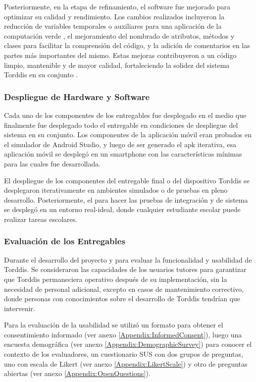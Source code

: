 				Posteriormente, en la etapa de refinamiento, el software fue mejorado para optimizar su calidad y rendimiento. Los cambios realizados incluyeron la reducción de variables temporales o auxiliares para una aplicación de la computación verde \citep{Firmansyah2024Integrating}, el mejoramiento del nombrado de atributos, métodos y clases para facilitar la comprensión del código, y la adición de comentarios en las partes más importantes del mismo. Estas mejoras contribuyeron a un código limpio, mantenible y de mayor calidad, fortaleciendo la solidez del sistema Torddis en su conjunto \citep{Marabesi2024Exploring}.
			
			\subsubsection{Despliegue de Hardware y Software}
				Cada uno de los componentes de los entregables fue desplegado en el medio que finalmente fue desplegado todo el entregable en condiciones de despliegue del sistema en su conjunto. Los componentes de la aplicación móvil eran probados en el simulador de Android Studio, y luego de ser generado el apk iterativa, esa aplicación móvil se desplegó en un smartphone con las características mínimas para las cuales fue desarrollada.
			
				El despliegue de los componentes del entregable final o del dispositivo Torddis se desplegaron iterativamente en ambientes simulados o de pruebas en pleno desarrollo. Posteriormente, el para hacer las pruebas de integración y de sistema se desplegó en un entorno real-ideal, donde cualquier estudiante escolar puede realizar tareas escolares.
			
			\subsubsection{Evaluación de los Entregables}
				Durante el desarrollo del proyecto y para evaluar la funcionalidad y usabilidad de Torddis. Se consideraron las capacidades de los usuarios tutores para garantizar que Torddis permaneciera operativo después de su implementación, sin la necesidad de personal adicional, excepto en casos de mantenimiento correctivo, donde personas con conocimientos sobre el desarrollo de Torddis tendrían que intervenir.
			
				Para la evaluación de la usabilidad se utilizó un formato para obtener el consentimiento informado (ver anexo \ref{Appendix:InformedConsent}), luego una encuesta demográfica (ver anexo \ref{Appendix:DemographicSurvey}) para conocer el contexto de los evaluadores, un cuestionario SUS con dos grupos de preguntas, uno con escala de Likert (ver anexo \ref{Appendix:LikertScale}) y otro de preguntas abiertas (ver anexo \ref{Appendix:OpenQuestions}).
			
